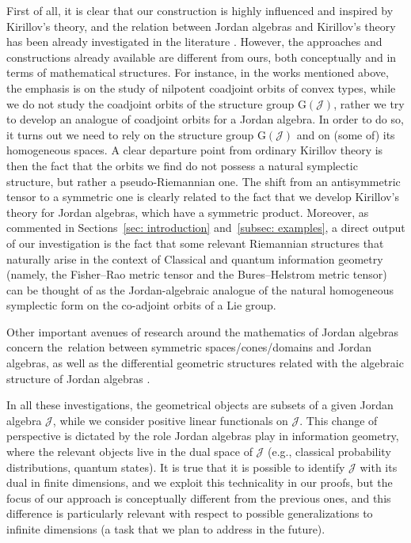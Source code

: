 \documentclass[10pt,a4paper]{amsart}
\numberwithin{equation}{section}
\newcommand{\Jcal}{\mathcal{J}}
\newcommand{\G}{\mathrm{G}}
\begin{document}
First of all, it is clear that our construction is highly influenced and inspired by Kirillov's theory, and the relation between Jordan algebras and Kirillov's theory has been already investigated in the literature \cite{H-N-O-1995,H-N-O-1996,H-N-O-1996-2}.
However, the approaches and constructions already available are different from ours, both conceptually and in terms of mathematical structures.
For instance, in the works mentioned above, the emphasis is on the study of nilpotent coadjoint orbits of convex types, while we do not study the coadjoint orbits of the structure group $\G(\Jcal)$, rather we try to develop an analogue of coadjoint orbits for a Jordan algebra.
In order to do so, it turns out we need to rely on the structure group $\G(\Jcal)$ and on (some of) its homogeneous spaces.
A clear departure point from ordinary Kirillov theory is then the fact that the orbits we find do not possess a natural symplectic structure, but rather a pseudo-Riemannian one.
The shift from an antisymmetric tensor to a symmetric one is clearly related to the fact that we develop Kirillov's theory for Jordan algebras, which have a symmetric product.
Moreover, as commented in Sections~\ref{sec: introduction} and~\ref{subsec: examples}, a direct output of our investigation is the fact that some relevant Riemannian structures that naturally arise in the context of Classical and quantum information geometry (namely, the Fisher--Rao metric tensor and the Bures--Helstrom metric tensor) can be thought of as the Jordan-algebraic analogue of the natural homogeneous symplectic form on the co-adjoint orbits of a Lie group.

Other important avenues of research around the mathematics of Jordan algebras concern the~relation between symmetric spaces/cones/domains and Jordan algebras, as well as the differential geometric structures related with the algebraic structure of Jordan algebras \cite{Bertram-2000,B-N-2005,Chu-2012,F-K-1994,Koecher-1999,Upmeier-1985}.


In all these investigations, the geometrical objects are subsets of a given Jordan algebra $\Jcal$, while we consider positive linear functionals on $\Jcal$.
This change of perspective is dictated by the role Jordan algebras play in information geometry, where the relevant objects live in the dual space of $\Jcal$ (e.g., classical probability distributions, quantum states).
It is true that it is possible to identify $\Jcal$ with its dual in finite dimensions, and we exploit this technicality in our proofs, but the focus of our approach is conceptually different from the previous ones, and this difference is particularly relevant with respect to possible generalizations to infinite dimensions (a task that we plan to address in the future).
\end{document}
